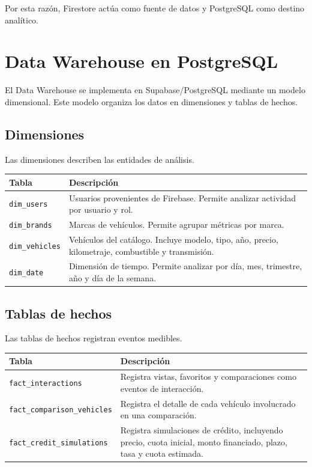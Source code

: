 \documentclass[12pt,letterpaper]{article}
\begin{document}
Por esta razón, Firestore actúa como fuente de datos y PostgreSQL como destino analítico.

\section{Data Warehouse en PostgreSQL}

El Data Warehouse se implementa en Supabase/PostgreSQL mediante un modelo dimensional. Este modelo organiza los datos en dimensiones y tablas de hechos.

\subsection{Dimensiones}

Las dimensiones describen las entidades de análisis.

\begin{longtable}{p{4cm}p{10cm}}
\toprule
\textbf{Tabla} & \textbf{Descripción} \\
\midrule
\endhead
\texttt{dim\_users} & Usuarios provenientes de Firebase. Permite analizar actividad por usuario y rol. \\
\texttt{dim\_brands} & Marcas de vehículos. Permite agrupar métricas por marca. \\
\texttt{dim\_vehicles} & Vehículos del catálogo. Incluye modelo, tipo, año, precio, kilometraje, combustible y transmisión. \\
\texttt{dim\_date} & Dimensión de tiempo. Permite analizar por día, mes, trimestre, año y día de la semana. \\
\bottomrule
\end{longtable}

\subsection{Tablas de hechos}

Las tablas de hechos registran eventos medibles.

\begin{longtable}{p{4cm}p{10cm}}
\toprule
\textbf{Tabla} & \textbf{Descripción} \\
\midrule
\endhead
\texttt{fact\_interactions} & Registra vistas, favoritos y comparaciones como eventos de interacción. \\
\texttt{fact\_comparison\_vehicles} & Registra el detalle de cada vehículo involucrado en una comparación. \\
\texttt{fact\_credit\_simulations} & Registra simulaciones de crédito, incluyendo precio, cuota inicial, monto financiado, plazo, tasa y cuota estimada. \\
\bottomrule
\end{longtable}
\end{document}
